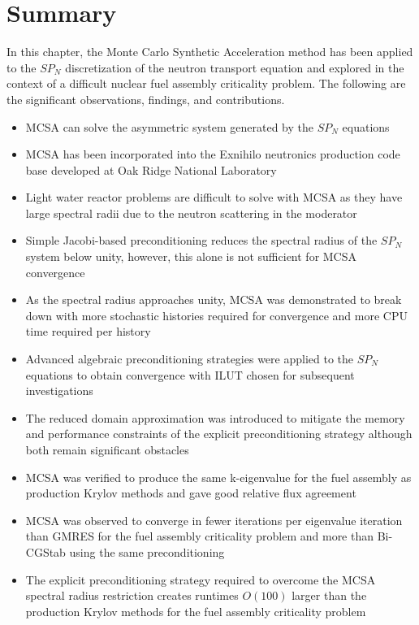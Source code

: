 \section{Summary}
\label{sec:mc_summary}

In this chapter, the Monte Carlo Synthetic Acceleration method has
been applied to the $SP_N$ discretization of the neutron transport
equation and explored in the context of a difficult nuclear fuel
assembly criticality problem. The following are the significant
observations, findings, and contributions.

\begin{itemize}
\item MCSA can solve the asymmetric system generated by the $SP_N$
  equations
\item MCSA has been incorporated into the Exnihilo neutronics
  production code base developed at Oak Ridge National Laboratory
\item Light water reactor problems are difficult to solve with MCSA as
  they have large spectral radii due to the neutron scattering in the
  moderator
\item Simple Jacobi-based preconditioning reduces the spectral radius
  of the $SP_N$ system below unity, however, this alone is not
  sufficient for MCSA convergence
\item As the spectral radius approaches unity, MCSA was demonstrated
  to break down with more stochastic histories required for
  convergence and more CPU time required per history
\item Advanced algebraic preconditioning strategies were applied to
  the $SP_N$ equations to obtain convergence with ILUT chosen for
  subsequent investigations
\item The reduced domain approximation was introduced to mitigate the
  memory and performance constraints of the explicit preconditioning
  strategy although both remain significant obstacles
\item MCSA was verified to produce the same k-eigenvalue for the fuel
  assembly as production Krylov methods and gave good relative flux
  agreement
\item MCSA was observed to converge in fewer iterations per eigenvalue
  iteration than GMRES for the fuel assembly criticality problem and
  more than Bi-CGStab using the same preconditioning
\item The explicit preconditioning strategy required to overcome the
  MCSA spectral radius restriction creates runtimes $O(100)$ larger
  than the production Krylov methods for the fuel assembly criticality
  problem
\end{itemize}
